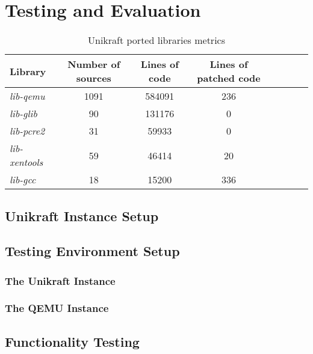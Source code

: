 \chapter{Testing and Evaluation}
\label{chapter:testing-evaluation}

\begin{center}
\begin{table}[htb]
  \caption{Unikraft ported libraries metrics}
  \begin{tabular}{l*{6}{c}r}
    Library & Number of sources & Lines of code & Lines of patched code \\
    \hline
    \textit{lib-qemu} & 1091 & 584091 & 236  \\
    \textit{lib-glib} & 90 & 131176 & 0  \\
    \textit{lib-pcre2} & 31 & 59933 & 0 \\
    \textit{lib-xentools} & 59 & 46414 & 20 \\
    \textit{lib-gcc} & 18 & 15200 & 336 \\
  \end{tabular}
  \label{table:reports}
\end{table}
\end{center}

\section{Unikraft Instance Setup}
\label{sec:unikraft-instance-setup}

\section{Testing Environment Setup}
\label{sec:testing-environment-setup}

\subsection{The Unikraft Instance}
\label{subsec:testing-environment-setup}

\subsection{The QEMU Instance}
\label{subsec:qemu-instance}


\section{Functionality Testing}
\label{sec:functionality-testing}

